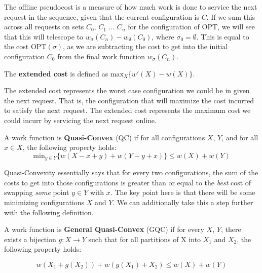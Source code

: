 The offline pseudocost is a measure of how much work is done to service the next request in the sequence, given that the current configuration is $C$. If we sum this across all requests on sets $C_0$, $C_1$ ... $C_n$ for the configuration of $\mathrm{OPT}$, we will see that this will telescope to $w_{\sigma}(C_n) - w_{\emptyset}(C_0)$, where $\sigma_0 = \emptyset$. This is equal to the cost $\mathrm{OPT}(\sigma)$, as we are subtracting the cost to get into the initial configuration $C_0$ from the final work function $w_\sigma(C_n)$.

\begin{definition}
    The \textbf{extended cost} is defined as $\mathrm{max}_X \{ w'(X) - w(X)\}$.
\end{definition}

The extended cost represents the worst case configuration we could be in given the next request. That is, the configuration that will maximize the cost incurred to satisfy the next request. The extended cost represents the maximum cost we could incurr by servicing the next request online.

\begin{definition}
    A work function is \textbf{Quasi-Convex} (QC) if for all configurations $X$, $Y$, and for all $x \in X$, the following property holds:
    \begin{equation*}
        \mathrm{min}_{y \in Y} \{ w(X - x + y) + w(Y - y + x)\} \leq w(X) + w(Y)
    \end{equation*}
\end{definition}

Quasi-Convexity essentially says that for every two configurations, the sum of the costs to get into those configurations is greater than or equal to the \textit{best} cost of swapping \textit{some} point $y\in Y$ with $x$. The key point here is that there will be some minimizing configurations $X$ and $Y$. We can additionally take this a step further with the following definition.

\begin{definition}
A work function is \textbf{General Quasi-Convex} (GQC) if for every $X$, $Y$, there exists a bijection $g: X \rightarrow Y$ such that for all partitions of X into $X_1$ and $X_2$, the following property holds:

\begin{equation*}
    w(X_1 + g(X_2)) + w(g(X_1) + X_2) \leq w(X) + w(Y)
\end{equation*}
\end{definition}

